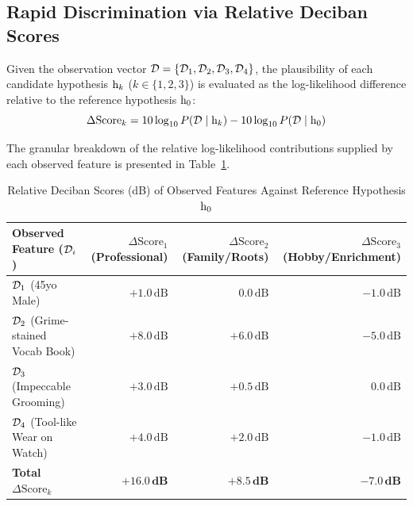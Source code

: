     \subsection{Rapid Discrimination via Relative Deciban Scores}

    Given the observation vector $\mathcal{D} = \{\mathcal{D}_1, \mathcal{D}_2, \mathcal{D}_3, \mathcal{D}_4\}$, the plausibility of each candidate hypothesis $\mathrm{h}_k$ ($k \in \{1, 2, 3\}$) is evaluated as the log-likelihood difference relative to the reference hypothesis $\mathrm{h}_0$:
    \begin{equation}
        \Delta \text{Score}_k = 10 \log_{10} P(\mathcal{D} \mid \mathrm{h}_k) - 10 \log_{10} P(\mathcal{D} \mid \mathrm{h}_0)
    \end{equation}

    The granular breakdown of the relative log-likelihood contributions supplied by each observed feature is presented in Table~\ref{tab:deciban_feature_breakdown}.

    \begin{table}[htbp]
        \centering
        \caption{Relative Deciban Scores (dB) of Observed Features Against Reference Hypothesis $\mathrm{h}_0$}
        \label{tab:deciban_feature_breakdown}
        \begin{tabular}{lrrr}
            \hline
            Observed Feature ($\mathcal{D}_i$) & $\Delta \text{Score}_1$ (Professional) & $\Delta \text{Score}_2$ (Family/Roots) & $\Delta \text{Score}_3$ (Hobby/Enrichment) \\
            \hline
            $\mathcal{D}_1$ (45yo Male) & $+1.0\,\text{dB}$ & $0.0\,\text{dB}$ & $-1.0\,\text{dB}$ \\
            $\mathcal{D}_2$ (Grime-stained Vocab Book) & $+8.0\,\text{dB}$ & $+6.0\,\text{dB}$ & $-5.0\,\text{dB}$ \\
            $\mathcal{D}_3$ (Impeccable Grooming) & $+3.0\,\text{dB}$ & $+0.5\,\text{dB}$ & $0.0\,\text{dB}$ \\
            $\mathcal{D}_4$ (Tool-like Wear on Watch) & $+4.0\,\text{dB}$ & $+2.0\,\text{dB}$ & $-1.0\,\text{dB}$ \\
            \hline
            \textbf{Total $\Delta \text{Score}_k$} & $\mathbf{+16.0\,\text{dB}}$ & $\mathbf{+8.5\,\text{dB}}$ & $\mathbf{-7.0\,\text{dB}}$ \\
            \hline
        \end{tabular}
    \end{table}

